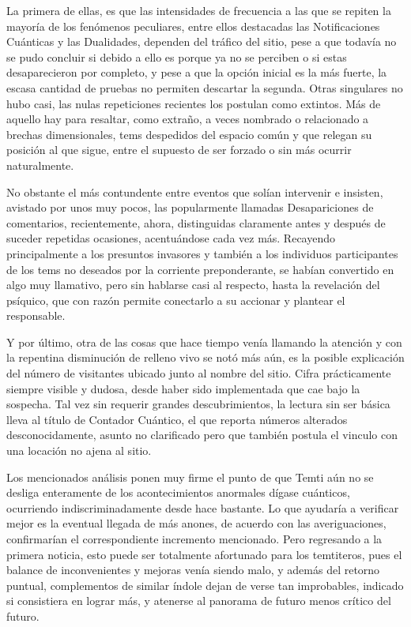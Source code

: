 \documentclass[
]{book}
\begin{document}
La primera de ellas, es que las intensidades de frecuencia a las que se repiten la mayoría de los fenómenos peculiares, entre ellos destacadas las Notificaciones Cuánticas y las Dualidades, dependen del tráfico del sitio, pese a que todavía no se pudo concluir si debido a ello es porque ya no se perciben o si estas desaparecieron por completo, y pese a que la opción inicial es la más fuerte, la escasa cantidad de pruebas no permiten descartar la segunda. Otras singulares no hubo casi, las nulas repeticiones recientes los postulan como extintos. Más de aquello hay para resaltar, como extraño, a veces nombrado o relacionado a brechas dimensionales, tems despedidos del espacio común y que relegan su posición al que sigue, entre el supuesto de ser forzado o sin más ocurrir naturalmente.

No obstante el más contundente entre eventos que solían intervenir e insisten, avistado por unos muy pocos, las popularmente llamadas Desapariciones de comentarios, recientemente, ahora, distinguidas claramente antes y después de suceder repetidas ocasiones, acentuándose cada vez más. Recayendo principalmente a los presuntos invasores y también a los individuos participantes de los tems no deseados por la corriente preponderante, se habían convertido en algo muy llamativo, pero sin hablarse casi al respecto, hasta la revelación del psíquico, que con razón permite conectarlo a su accionar y plantear el responsable.

Y por último, otra de las cosas que hace tiempo venía llamando la atención y con la repentina disminución de relleno vivo se notó más aún, es la posible explicación del número de visitantes ubicado junto al nombre del sitio. Cifra prácticamente siempre visible y dudosa, desde haber sido implementada que cae bajo la sospecha. Tal vez sin requerir grandes descubrimientos, la lectura sin ser básica lleva al título de Contador Cuántico, el que reporta números alterados desconocidamente, asunto no clarificado pero que también postula el vinculo con una locación no ajena al sitio.

Los mencionados análisis ponen muy firme el punto de que Temti aún no se desliga enteramente de los acontecimientos anormales dígase cuánticos, ocurriendo indiscriminadamente desde hace bastante. Lo que ayudaría a verificar mejor es la eventual llegada de más anones, de acuerdo con las averiguaciones, confirmarían el correspondiente incremento mencionado. Pero regresando a la primera noticia, esto puede ser totalmente afortunado para los temtiteros, pues el balance de inconvenientes y mejoras venía siendo malo, y además del retorno puntual, complementos de similar índole dejan de verse tan improbables, indicado si consistiera en lograr más, y atenerse al panorama de futuro menos crítico del futuro.
\end{document}
